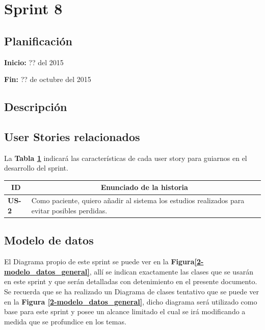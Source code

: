 \documentclass[a4paper,12pt]{article}
\begin{document}
\section{Sprint 8} %

\subsection{Planificación}

\textbf{Inicio: }?? del 2015 

\textbf{Fin:} ?? de octubre del 2015



\subsection{Descripción}

\subsection{User Stories relacionados}
La \textbf{Tabla \ref{US-Sprint8}} indicará las características de cada user story para guiarnos en el desarrollo del sprint.
\begin{table}[h]
    \label{US-Sprint8}
    \centering
	\begin{tabular}{|l|p{9cm}|}
	\hline
        \multicolumn{1}{|c|}{\textbf{ID}} &
        \multicolumn{1}{|c|}{\textbf{Enunciado de la historia}} \\          
    \hline
        \textbf{US-2 } & Como paciente, quiero añadir al sistema los estudios realizados para evitar posibles perdidas.\\
     \hline 
     
    \end{tabular}
\end{table}

\subsection{Modelo de datos}
El Diagrama propio de este sprint se puede ver en la \textbf{Figura\ref{2-modelo_datos_general}}, allí se indican exactamente las clases que se usarán en este sprint y que serán detalladas con detenimiento en el presente documento. Se recuerda que se ha realizado un Diagrama de clases tentativo que se puede ver en la \textbf{Figura \ref{2-modelo_datos_general}}, dicho diagrama  será utilizado como base para este sprint y posee un alcance limitado el cual se irá modificando a medida que se profundice en los temas.
\end{document}
